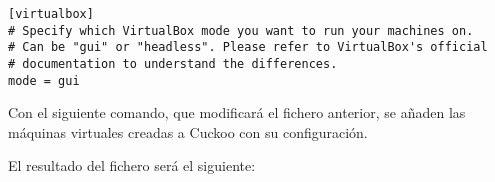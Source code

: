 \lstset{language=bash,breaklines=true, basicstyle=\footnotesize}
\begin{lstlisting}[frame=single, caption=Fichero ``virtualbox.conf'']
[virtualbox]
# Specify which VirtualBox mode you want to run your machines on.
# Can be "gui" or "headless". Please refer to VirtualBox's official
# documentation to understand the differences.
mode = gui
\end{lstlisting}

Con el siguiente comando, que modificará el fichero anterior, se añaden las máquinas virtuales creadas a Cuckoo con su configuración. \cite{HATCHING}


El resultado del fichero será el siguiente:

\break

